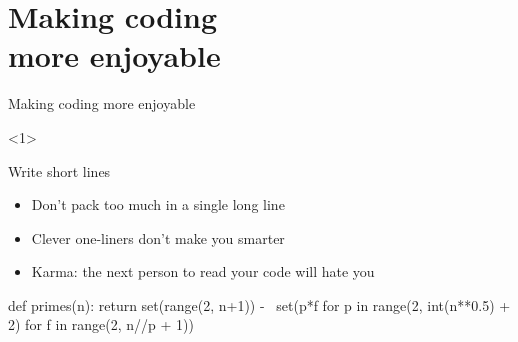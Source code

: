 \section{Making coding \\ more enjoyable}

\begin{frame}[fragile]{Making coding more enjoyable}
    \begin{onlyenv}<1> %
        \begin{block}{Write short lines}
            \begin{itemize}
                \item Don't pack too much in a single long line
                \item Clever one\hyp{}liners don't make you smarter
                \item Karma: the next person to read your code will hate you
            \end{itemize}
            \vfill
            \begin{py3}
                def primes(n):
                    return set(range(2, n+1)) - \
                           set(p*f for p in range(2, int(n**0.5) + 2)
                                   for f in range(2, n//p + 1))
            \end{py3}
        \end{block}
    \end{onlyenv}
\end{frame}
